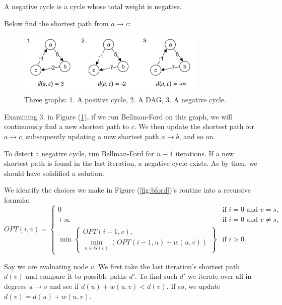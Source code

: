 \newpage

\begin{Def}

    A negative cycle is a cycle whose total weight is negative.
\end{Def}

\noindent
Below find the shortest path from $a\to c$:
\begin{figure}[h]
    \centering
    \includegraphics[width=0.8\textwidth]{Sections/dp/negcyc.png}
    \caption{Three graphs: 1. A positive cycle, 2. A DAG, 3. A negative cycle.}
    \label{fig:ncycle}
\end{figure}

\noindent
Examining 3. in Figure (\ref{fig:ncycle}), if we run Bellman-Ford on this graph, we will continuously find a new shortest path to $c$.
We then update the shortest path for $a\to c$, subsequently updating a new shortest path $a\to b$, and so on.
\begin{theo}

    To detect a negative cycle, run Bellman-Ford for $n-1$ iterations. If a new shortest path is found in the last iteration, a negative cycle exists. As by then,
    we should have solidified a solution.
\end{theo}
\noindent
We identify the choices we make in Figure (\ref{fig:bford})'s routine into a recursive formula:
\[
OPT(i, v) = 
\begin{cases} 
0 & \text{if } i = 0 \text{ and } v = s, \\ 
+\infty & \text{if } i = 0 \text{ and } v \neq s, \\
\min \left\{ 
\begin{array}{l}
OPT(i - 1, v), \\
\min\limits_{u \in G(v)} \left( OPT(i - 1, u) + w(u, v) \right)
\end{array} 
\right\} & \text{if } i > 0.
\end{cases}
\]

\noindent
Say we are evaluating node $v$. We first take the last iteration's shortest path $d(v)$ and compare it to possible paths $d'$. To 
find such $d'$ we iterate over all in-degrees $u\to v$ and see if $d(u)+w(u,v)<d(v)$. If so, we update $d(v)=d(u)+w(u,v)$.\\

